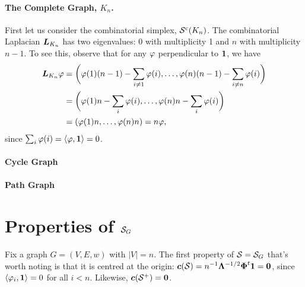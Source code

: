 
\paragraph{The Complete Graph, $K_n$.}
First let us consider the combinatorial simplex, $\mathcal{S}^{\textnormal{c}}(K_n)$.  The combinatorial Laplacian $\vb*{L}_{K_n}$ has two eigenvalues: 0 with multiplicity 1 and $n$ with multiplicity $n-1$. To see this, observe that for any $\varphi$ perpendicular to $\vb{1}$, we have 
\begin{align*}
\vb*{L}_{K_n}\varphi &= \bigg(\varphi(1)(n-1)-\sum_{i\neq 1}\varphi(i),\dots,\varphi(n)(n-1)-\sum_{i\neq n}\varphi(i)\bigg) \\
&= \bigg(\varphi(1)n - \sum_i \varphi(i), \dots,\varphi(n)n - \sum_i \varphi(i)\bigg) \\
&= (\varphi(1)n,\dots,\varphi(n)n) = n\varphi,
\end{align*}
since $\sum_i\varphi(i)=\langle \varphi,\vb{1}\rangle =0$. 

\paragraph{Cycle Graph}

\paragraph{Path Graph}


\section{Properties of \texorpdfstring{$\mathcal{S}_G$}{Graph Simplices}}
Fix a graph $G=(V,E,w)$ with $|V|=n$. The first property of $\mathcal{S}=\mathcal{S}_G$ that's worth noting is that it is centred at the origin: $\vb*{c}(\mathcal{S}) = n^{-1}\vb{\Lambda}^{-1/2}\boldsymbol{\Phi}^t \vb{1} =\vb{0}$, since $\langle \varphi_i,\vb{1}\rangle =0$ for all $i<n$.  Likewise, $\vb*{c}(\mathcal{S}^+)=\vb{0}$. 




